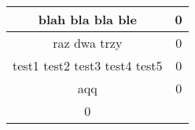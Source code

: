 \documentclass{article}
\begin{document}
\begin{tabular}{|c|c|}\hline
blah bla bla ble
 & 0\\
\hline
raz dwa trzy
 & 0\\
\hline
test1 test2 test3 test4 test5
 & 0\\
\hline
aqq
 & 0\\
\hline
0 & \\
\hline
\end{tabular}
\end{document}
